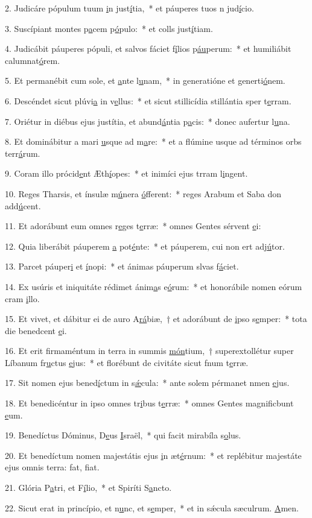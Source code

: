 2. Judicáre pópulum tuum \uline{i}n just\uline{í}tia,~* et páuperes tuos n jud\uline{í}cio.\par 
3. Suscípiant montes p\uline{a}cem p\uline{ó}pulo:~* et colls just\uline{í}tiam.\par 
4. Judicábit páuperes pópuli, et salvos fáciet f\uline{í}lios p\uline{áu}perum:~* et humiliábit calumnat\uline{ó}rem.\par 
5. Et permanébit cum sole, et \uline{a}nte l\uline{u}nam,~* in generatióne et generti\uline{ó}nem.\par 
6. Descéndet sicut plúvi\uline{a} in v\uline{e}llus:~* et sicut stillicídia stillántia sper t\uline{e}rram.\par 
7. Oriétur in diébus ejus justítia, et abund\uline{á}ntia p\uline{a}cis:~* donec aufertur l\uline{u}na.\par 
8. Et dominábitur a mari \uline{u}sque ad m\uline{a}re:~* et a flúmine usque ad términos orbs terr\uline{á}rum.\par 
9. Coram illo prócid\uline{e}nt Æth\uline{í}opes:~* et inimíci ejus trram l\uline{i}ngent.\par 
10. Reges Tharsis, et ínsulæ m\uline{ú}nera \uline{ó}fferent:~* reges Arabum et Saba don add\uline{ú}cent.\par 
11. Et adorábunt eum omnes r\uline{e}ges t\uline{e}rræ:~* omnes Gentes sérvent \uline{e}i:\par 
12. Quia liberábit páuperem \uline{a} pot\uline{é}nte:~* et páuperem, cui non ert adj\uline{ú}tor.\par 
13. Parcet páuper\uline{i} et \uline{í}nopi:~* et ánimas páuperum slvas f\uline{á}ciet.\par 
14. Ex usúris et iniquitáte rédimet ánim\uline{a}s e\uline{ó}rum:~* et honorábile nomen eórum cram \uline{i}llo.\par 
15. Et vivet, et dábitur ei de auro A\uline{rá}biæ,~† et adorábunt de \uline{i}pso s\uline{e}mper:~* tota die benedcent \uline{e}i.\par 
16. Et erit firmaméntum in terra in summis \uline{món}tium,~† superextollétur super Líbanum fr\uline{u}ctus \uline{e}jus:~* et florébunt de civitáte sicut fnum t\uline{e}rræ.\par 
17. Sit nomen ejus bened\uline{í}ctum in s\uline{ǽ}cula:~* ante solem pérmanet nmen \uline{e}jus.\par 
18. Et benedicéntur in ipso omnes tr\uline{i}bus t\uline{e}rræ:~* omnes Gentes magnificbunt \uline{e}um.\par 
19. Benedíctus Dóminus, D\uline{e}us \uline{I}sraël,~* qui facit mirabíla s\uline{o}lus.\par 
20. Et benedíctum nomen majestátis ejus \uline{i}n æt\uline{é}rnum:~* et replébitur majestáte ejus omnis terra: fat, f\uline{i}at.\par 
21. Glória P\uline{a}tri, et F\uline{í}lio,~* et Spiríti S\uline{a}ncto.\par 
22. Sicut erat in princípio, et n\uline{u}nc, et s\uline{e}mper,~* et in sǽcula sæculrum. \uline{A}men.\par 
